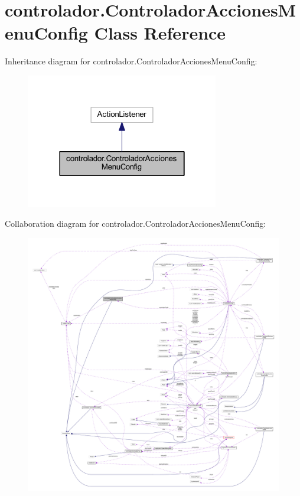 \hypertarget{classcontrolador_1_1_controlador_acciones_menu_config}{}\section{controlador.\+Controlador\+Acciones\+Menu\+Config Class Reference}
\label{classcontrolador_1_1_controlador_acciones_menu_config}


Inheritance diagram for controlador.\+Controlador\+Acciones\+Menu\+Config\+:
\nopagebreak
\begin{figure}[H]
\begin{center}
\leavevmode
\includegraphics[width=238pt]{classcontrolador_1_1_controlador_acciones_menu_config__inherit__graph}
\end{center}
\end{figure}


Collaboration diagram for controlador.\+Controlador\+Acciones\+Menu\+Config\+:
\nopagebreak
\begin{figure}[H]
\begin{center}
\leavevmode
\includegraphics[width=350pt]{classcontrolador_1_1_controlador_acciones_menu_config__coll__graph}
\end{center}
\end{figure}
